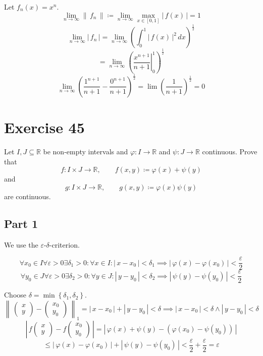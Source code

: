 \documentclass[a4paper]{article}
\theoremstyle{definition}
\newcommand\abs[1]{\left|\,#1\,\right|}
\newcommand\norm[1]{\left\|\,#1\,\right\|}
\newcommand\set[1]{\left\{#1\right\}}
\begin{document}
Let $f_n(x) = x^n$.
\[ \lim_{n\to\infty} \norm{f_n} \coloneqq \lim_{n\to\infty} \max_{x \in [0,1]} \abs{f(x)} = 1 \]
\[ \lim_{n\to\infty} \abs{f_n} = \lim_{n\to\infty} \left(\int_0^1 \abs{f(x)}^2 \, dx\right)^{\frac12} \]
\[ = \lim_{n\to\infty} \left(\left.\frac{x^{n+1}}{n+1} \right|_0^1\right)^{\frac12} \]
\[ \lim_{n\to\infty} \left(\frac{1^{n+1}}{n + 1} - \frac{0^{n+1}}{n+1}\right)^{\frac12} = \lim \left(\frac{1}{n+1}\right)^{\frac12} = 0 \]

\section{Exercise 45}
\begin{ex}
  Let $I, J \subseteq \mathbb R$ be non-empty intervals and $\varphi: I \to \mathbb R$ and $\psi: J \to \mathbb R$ continuous. Prove that
  \[ f: I \times J \to \mathbb R, \qquad f(x,y) \coloneqq \varphi(x) + \psi(y) \]
  and
  \[ g: I \times J \to \mathbb R, \qquad g(x,y) \coloneqq \varphi(x) \psi(y) \]
  are continuous.
\end{ex}

\subsection{Part 1}

We use the $\varepsilon$-$\delta$-criterion.

\[
  \forall x_0 \in I \forall \varepsilon > 0 \exists \delta_1 > 0: \forall x \in I:
  \abs{x - x_0} < \delta_1 \implies \abs{\varphi(x) - \varphi(x_0)} < \frac{\varepsilon}{2}
\] \[
  \forall y_0 \in J \forall \varepsilon > 0 \exists \delta_2 > 0: \forall y \in J:
  \abs{y - y_0} < \delta_2 \implies \abs{\psi(y) - \psi(y_0)} < \frac{\varepsilon}{2}
\]

Choose $\delta = \min\set{\delta_1, \delta_2}$.
\[
  \norm{\begin{pmatrix} x \\ y \end{pmatrix} - \begin{pmatrix} x_0 \\ y_0 \end{pmatrix}}_1
  = \abs{x - x_0} + \abs{y - y_0} < \delta \implies \abs{x - x_0} < \delta \land \abs{y - y_0} < \delta
\] \[
  \abs{f\begin{pmatrix} x \\ y \end{pmatrix} - f\begin{pmatrix} x_0 \\ y_0 \end{pmatrix}}
  = \abs{\varphi(x) + \psi(y) - (\varphi(x_0) - \psi(y_0))}
\] \[
  \leq \abs{\varphi(x) - \varphi(x_0)} + \abs{\psi(y) - \psi(y_0)}
  < \frac\varepsilon2 + \frac\varepsilon2 = \varepsilon
\]
\end{document}
